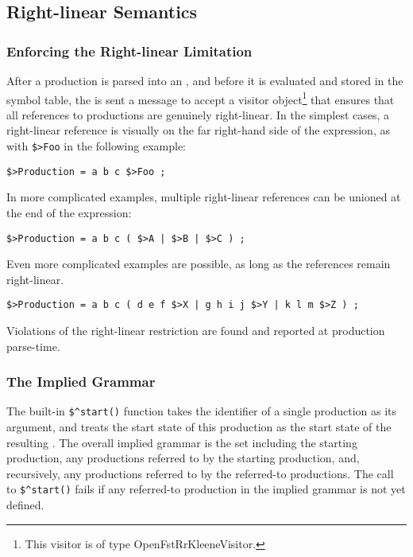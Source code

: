 \subsection{Right-linear Semantics}


\subsubsection{Enforcing the Right-linear Limitation}

After a production is parsed into an
, and before it is evaluated and stored in the symbol table, the
 is sent a message to accept a visitor object\footnote{This
visitor is of type
OpenFstRrKleeneVisitor.} that ensures that
all references to productions are genuinely right-linear.  In the simplest cases,
a right-linear reference is visually on the far right-hand side of the
expression, as with \verb!$>Foo! in the following example:

\begin{Verbatim}
$>Production = a b c $>Foo ;
\end{Verbatim}

\noindent
In more complicated examples, multiple right-linear references can be unioned 
at the end of the expression:

\begin{Verbatim}
$>Production = a b c ( $>A | $>B | $>C ) ;
\end{Verbatim}

\noindent
Even more complicated examples are possible, as long as the references remain
right-linear. 

\begin{Verbatim}
$>Production = a b c ( d e f $>X | g h i j $>Y | k l m $>Z ) ;
\end{Verbatim}

\noindent
Violations of the right-linear restriction are found and reported
at production parse-time.

\subsubsection{The Implied Grammar}

The built-in \verb!$^start()! function takes the identifier of a single
production as its argument, and treats the start state of this production as the
start state of the resulting \fsm{}.  The overall implied grammar is the set
including the
starting production, any productions referred to by the starting
production, and, 
recursively, any productions referred to by the referred-to productions.
The call to \verb!$^start()! fails if any referred-to production in the
implied grammar is
not yet defined.

